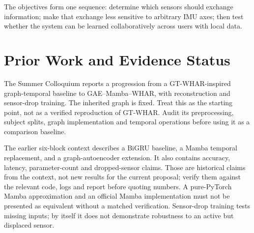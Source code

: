 \documentclass[10pt,a4paper]{article}
\begin{document}
The objectives form one sequence: determine which sensors should exchange information; make that exchange less sensitive to arbitrary IMU axes; then test whether the system can be learned collaboratively across users with local data.

\section{Prior Work and Evidence Status}
The Summer Colloquium reports a progression from a GT-WHAR-inspired graph-temporal baseline to GAE--Mamba--WHAR, with reconstruction and sensor-drop training. The inherited graph is fixed. Treat this as the starting point, not as a verified reproduction of GT-WHAR. Audit its preprocessing, subject splits, graph implementation and temporal operations before using it as a comparison baseline.

The earlier six-block context describes a BiGRU baseline, a Mamba temporal replacement, and a graph-autoencoder extension. It also contains accuracy, latency, parameter-count and dropped-sensor claims. Those are historical claims from the context, not new results for the current proposal; verify them against the relevant code, logs and report before quoting numbers. A pure-PyTorch Mamba approximation and an official Mamba implementation must not be presented as equivalent without a matched verification. Sensor-drop training tests missing inputs; by itself it does not demonstrate robustness to an active but displaced sensor.
\end{document}
